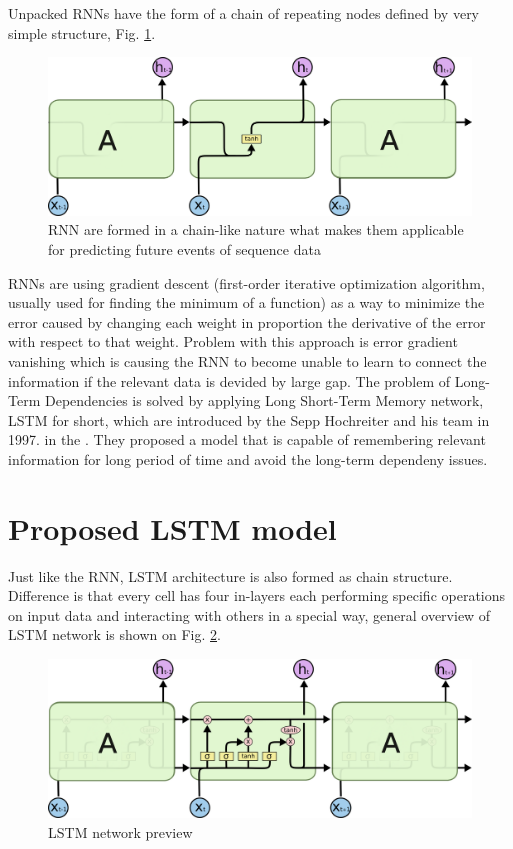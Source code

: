 \documentclass[10pt, a4paper]{article} %
\begin{document}
Unpacked RNNs have the form of a chain of repeating nodes defined by very simple structure, Fig. \ref{}. \cite{Olah_lstm}
\begin{figure}
	\centering
	\includegraphics[scale=.5]{images/RNN-unpacked.png} %
	\caption{RNN are formed in a chain-like nature what makes them applicable for predicting future events of sequence data}
	\label{rnn} 
\end{figure}

RNNs are using gradient descent (first-order iterative optimization algorithm, usually used for finding the minimum of a function) as a way to minimize the error caused by changing each weight in proportion the derivative of the error with respect to that weight. Problem with this approach is error gradient vanishing which is causing the RNN to become unable to learn to connect the information if the relevant data is devided by large gap. 
The problem of Long-Term Dependencies is solved by applying Long Short-Term Memory network, LSTM for short, which are introduced by the Sepp Hochreiter and his team in 1997. in the \cite{Hochreiter_LSTM}. They proposed a model that is capable of remembering relevant information for long period of time and avoid the long-term dependeny issues. 

\section{Proposed LSTM model}

Just like the RNN, LSTM architecture is also formed as chain structure. Difference is that every cell has four in-layers each performing specific operations on input data and interacting with others in a special way, general overview of LSTM network is shown on Fig. \ref{lstm}.
\begin{figure}
	\centering
	\includegraphics[scale=.5]{images/LSTM.png} %
	\caption{LSTM network preview}
	\label{lstm} 
\end{figure}
\end{document}
